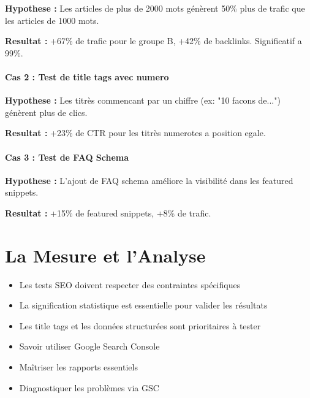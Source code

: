 \documentclass[12pt,a4paper,twoside]{report}
\newcommand{\level}[1]{\medskip\bigskip}
\begin{document}
\textbf{Hypothese :} Les articles de plus de 2000 mots génèrent 50\% plus de trafic que les articles de 1000 mots.

\textbf{Resultat :} +67\% de trafic pour le groupe B, +42\% de backlinks. Significatif a 99\%.

\subsection{Cas 2 : Test de title tags avec numero}

\textbf{Hypothese :} Les titrès commencant par un chiffre (ex: "10 facons de...") génèrent plus de clics.

\textbf{Resultat :} +23\% de CTR pour les titrès numerotes a position egale.

\subsection{Cas 3 : Test de FAQ Schema}

\textbf{Hypothese :} L'ajout de FAQ schema améliore la visibilité dans les featured snippets.

\textbf{Resultat :} +15\% de featured snippets, +8\% de trafic.



\part{La Mesure et l'Analyse}
\label{part:mesure}

\begin{takeaways}
\begin{itemize}
    \item Les tests SEO doivent respecter des contraintes spécifiques
    \item La signification statistique est essentielle pour valider les résultats
    \item Les title tags et les données structurées sont prioritaires à tester
\end{itemize}
\end{takeaways}

\level{1}
\begin{objectives}
\begin{itemize}
    \item Savoir utiliser Google Search Console
    \item Maîtriser les rapports essentiels
    \item Diagnostiquer les problèmes via GSC
\end{itemize}
\end{objectives}
\end{document}
